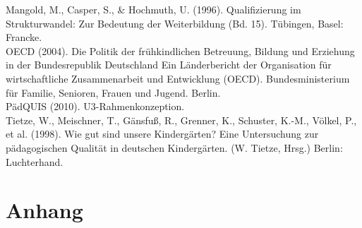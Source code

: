 \documentclass[12pt,a4paper]{article}
\begin{document}
Mangold, M., Casper, S., \& Hochmuth, U. (1996). Qualifizierung im Strukturwandel: Zur Bedeutung der Weiterbildung (Bd. 15). Tübingen, Basel: Francke.\\

OECD (2004). Die Politik der frühkindlichen Betreuung, Bildung und Erziehung in der Bundesrepublik Deutschland Ein Länderbericht der Organisation für wirtschaftliche Zusammenarbeit und Entwicklung (OECD). Bundesministerium für Familie, Senioren, Frauen und Jugend. Berlin.\\

PädQUIS (2010). U3-Rahmenkonzeption.\\

Tietze, W., Meischner, T., Gänsfuß, R., Grenner, K., Schuster, K.-M., Völkel, P., et al. (1998). Wie gut sind unsere Kindergärten? Eine Untersuchung zur pädagogischen Qualität in deutschen Kindergärten. (W. Tietze, Hrsg.) Berlin: Luchterhand.



\pagebreak

\begin{appendix}
\section*{Anhang}
\normalsize
\section{}
\end{appendix}
  
\end{document}
